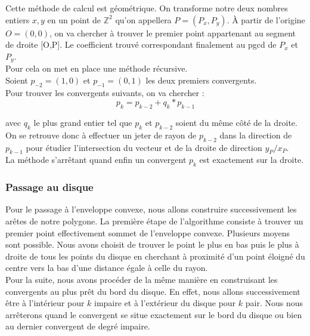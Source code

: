Cette méthode de calcul est géométrique. On transforme notre deux nombres entiers $x, y$ en un point de $\mathbb{Z}^{2}$ qu'on appellera $P = (P_x, P_y)$. À partir de l’origine $O=(0,0)$, on va chercher à trouver le premier point appartenant au segment de droite [O,P]. Le coefficient trouvé correspondant finalement au pgcd de $P_x$ et $P_y$.\\

Pour cela on met en place une méthode récursive.\\
Soient $p_{-2} = (1,0)$ et $p_{-1} = (0,1)$ les deux premiers convergents.\\

Pour trouver les convergents suivants, on va chercher :
$$p_{k} = p_{k-2} + q_k * p_{k-1}$$

avec $q_k$ le plus grand entier tel que $p_{k}$ et $p_{k-2}$ soient du même côté de la droite.\\

On se retrouve donc à effectuer un jeter de rayon de $p_{k-2}$ dans la direction de $p_{k-1}$ pour étudier l’intersection du vecteur et de la droite de direction $y_P / x_P$.\\

La méthode s’arrêtant quand enfin un convergent $p_{k}$ est exactement sur la droite.

\subsubsection{Passage au disque}

Pour le passage à l'enveloppe convexe, nous allons construire successivement les arêtes de notre polygone. La première étape de l'algorithme consiste à trouver un premier point effectivement sommet de l'enveloppe convexe. Plusieurs moyens sont possible. Nous avons choisit de trouver le point le plus en bas puis le plus à droite de tous les points du disque en cherchant à proximité d'un point éloigné du centre vers la bas d'une distance égale à celle du rayon.\\

Pour la suite, nous avons procéder de la même manière en construisant les convergents au plus prêt du bord du disque. En effet, nous allons successivement être à l'intérieur pour $k$ impaire et à l'extérieur du disque pour $k$ pair. Nous nous arrêterons quand le convergent se situe exactement sur le bord du disque ou bien au dernier convergent de degré impaire.\\

